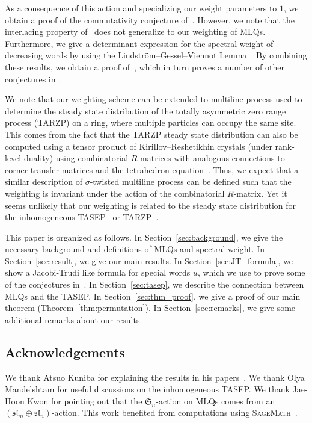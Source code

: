 \documentclass[reqno]{amsart}
\newcommand{\0}{\phantom{c}}
\newcommand{\SymGp}[1]{\mathfrak{S}_{#1}} %
\theoremstyle{plain}
\theoremstyle{definition}
\numberwithin{equation}{section}
\begin{document}
As a consequence of this action and specializing our weight parameters to $1$, we obtain a proof of the commutativity conjecture of~\cite{AAMP}.
However, we note that the interlacing property of~\cite{AAMP} does not generalize to our weighting of MLQs.
Furthermore, we give a determinant expression for the spectral weight of decreasing words by using the Lindstr\"om--Gessel--Viennot Lemma~\cite{GV85,Lindstrom73}.
By combining these results, we obtain a proof of~\cite[Conj.~3.10]{AasLin17}, which in turn proves a number of other conjectures in~\cite{AasLin17}.

We note that our weighting scheme can be extended to multiline process used to determine the steady state distribution of the totally asymmetric zero range process (TARZP) on a ring, where multiple particles can occupy the same site.
This comes from the fact that the TARZP steady state distribution can also be computed using a tensor product of Kirillov--Reshetikhin crystals (under rank-level duality) using combinatorial $R$-matrices with analogous connections to corner transfer matrices and the tetrahedron equation~\cite{KMO16TARZP,KMO16TARZPII}.
Thus, we expect that a similar description of $\sigma$-twisted multiline process can be defined such that the weighting is invariant under the action of the combinatorial $R$-matrix.
Yet it seems unlikely that our weighting is related to the steady state distribution for the inhomogeneous TASEP~\cite{AM13,AL14} or TARZP~\cite{KMO16II}.

This paper is organized as follows.
In Section~\ref{sec:background}, we give the necessary background and definitions of MLQs and spectral weight.
In Section~\ref{sec:result}, we give our main results.
In Section~\ref{sec:JT_formula}, we show a Jacobi-Trudi like formula for special words $u$, which we use to prove some of the conjectures in~\cite{AasLin17}.
In Section~\ref{sec:tasep}, we describe the connection between MLQs and the TASEP.
In Section~\ref{sec:thm_proof}, we give a proof of our main theorem (Theorem~\ref{thm:permutation}).
In Section~\ref{sec:remarks}, we give some additional remarks about our results.


\subsection{Acknowledgements}

We thank Atsuo Kuniba for explaining the results in his papers~\cite{KMO15,KMO16II,KMO16,KMO16TARZP,KMO16TARZPII}.
We thank Olya Mandelshtam for useful discussions on the inhomogeneous TASEP.
We thank Jae-Hoon Kwon for pointing out that the $\SymGp{n}$-action on MLQs comes from an $(\mathfrak{sl}_m \oplus \mathfrak{sl}_n)$-action.
This work benefited from computations using \textsc{SageMath}~\cite{sage,combinat}.
\end{document}
